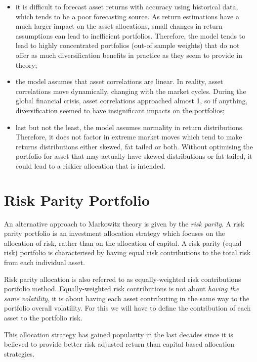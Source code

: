 \begin{itemize}
\tightlist
\item
  it is difficult to forecast asset returns with accuracy using
  historical data, which tends to be a poor forecasting source. As
  return estimations have a much larger impact on the asset allocations,
  small changes in return assumptions can lead to inefficient
  portfolios. Therefore, the model tends to lead to highly concentrated
  portfolios (out-of sample weights) that do not offer as much
  diversification benefits in practice as they seem to provide in
  theory;
\item
  the model assumes that asset correlations are linear. In reality,
  asset correlations move dynamically, changing with the market cycles.
  During the global financial crisis, asset correlations approached
  almost 1, so if anything, diversification seemed to have insignificant
  impacts on the portfolios;
\item
  last but not the least, the model assumes normality in return
  distributions. Therefore, it does not factor in extreme market moves
  which tend to make returns distributions either skewed, fat tailed or
  both. Without optimising the portfolio for asset that may actually
  have skewed distributions or fat tailed, it could lead to a riskier
  allocation that is intended.
\end{itemize}

\section{Risk Parity Portfolio}
\label{risk-parity-portfolio}

An alternative approach to Markowitz theory is given by the
\emph{risk parity}. A risk parity portfolio is an investment allocation
strategy which focuses on the allocation of risk, rather than on the
allocation of capital. 
A risk parity (equal risk) portfolio is characterised by having equal risk contributions to the total risk from each individual asset. 

Risk parity allocation is also referred to as equally-weighted risk
contributions portfolio method. Equally-weighted risk contributions is
not about \emph{having the same volatility}, it is about having each
asset contributing in the same way to the portfolio overall volatility.
For this we will have to define the contribution of each asset to the
portfolio risk. 

This allocation strategy has gained popularity in the
last decades since it is believed to provide better risk adjusted return
than capital based allocation strategies.

